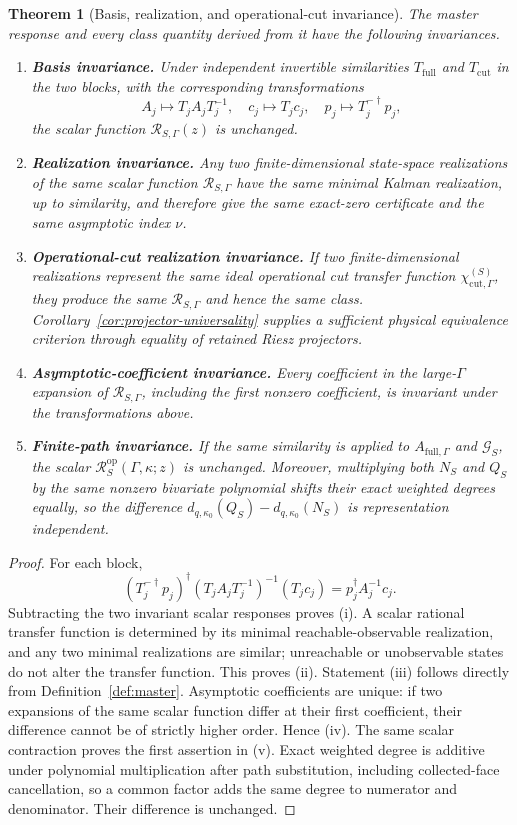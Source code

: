 \documentclass[11pt]{article}
\newtheorem{theorem}{Theorem}[section]
\theoremstyle{definition}
\theoremstyle{remark}
\theoremstyle{plain}
\newcommand{\R}{\mathcal R}
\newcommand{\full}{\mathrm{full}}
\newcommand{\cut}{\mathrm{cut}}
\newcommand{\Gcut}{\mathcal G}
\newcommand{\op}{\mathrm{op}}
\begin{document}
\begin{theorem}[Basis, realization, and operational-cut invariance]\label{thm:invariance}
The master response and every class quantity derived from it have the following invariances.
\begin{enumerate}[label=(\roman*)]
  \item \textbf{Basis invariance.}  Under independent invertible similarities $T_{\full}$ and $T_{\cut}$ in the two blocks, with the corresponding transformations
  \[
   A_j\mapsto T_jA_jT_j^{-1},\quad c_j\mapsto T_jc_j,
   \quad p_j\mapsto T_j^{-\dagger}p_j,
  \]
  the scalar function $\R_{S,\Gamma}(z)$ is unchanged.
  \item \textbf{Realization invariance.}  Any two finite-dimensional state-space realizations of the same scalar function $\R_{S,\Gamma}$ have the same minimal Kalman realization, up to similarity, and therefore give the same exact-zero certificate and the same asymptotic index $\nu$.
  \item \textbf{Operational-cut realization invariance.}  If two finite-dimensional realizations represent the same ideal operational cut transfer function $\chi_{\cut,\Gamma}^{(S)}$, they produce the same $\R_{S,\Gamma}$ and hence the same class.  Corollary~\ref{cor:projector-universality} supplies a sufficient physical equivalence criterion through equality of retained Riesz projectors.
  \item \textbf{Asymptotic-coefficient invariance.}  Every coefficient in the large-$\Gamma$ expansion of $\R_{S,\Gamma}$, including the first nonzero coefficient, is invariant under the transformations above.
  \item \textbf{Finite-path invariance.}  If the same similarity is applied
  to $A_{\full,\Gamma}$ and $\Gcut_S$, the scalar
  $\R_S^{\op}(\Gamma,\kappa;z)$ is unchanged.  Moreover, multiplying both
  $N_S$ and $Q_S$ by the same nonzero bivariate polynomial shifts their exact
  weighted degrees equally, so the difference
  $d_{q,\kappa_0}(Q_S)-d_{q,\kappa_0}(N_S)$ is representation independent.
\end{enumerate}
\end{theorem}

\begin{proof}
For each block,
\[
 (T_j^{-\dagger}p_j)^\dagger(T_jA_jT_j^{-1})^{-1}(T_jc_j)
 =p_j^\dagger A_j^{-1}c_j.
\]
Subtracting the two invariant scalar responses proves (i).  A scalar rational transfer function is determined by its minimal reachable-observable realization, and any two minimal realizations are similar; unreachable or unobservable states do not alter the transfer function.  This proves (ii).  Statement (iii) follows directly from Definition~\ref{def:master}.  Asymptotic coefficients are unique: if two expansions of the same scalar function differ at their first coefficient, their difference cannot be of strictly higher order.  Hence (iv).  The same scalar contraction proves the first assertion in (v).  Exact weighted degree is additive under polynomial multiplication after path substitution, including collected-face cancellation, so a common factor adds the same degree to numerator and denominator.  Their difference is unchanged.
\end{proof}
\end{document}
